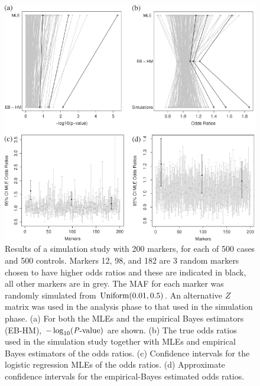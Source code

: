 \documentclass[oupdraft]{bio}
\begin{document}
\begin{figure}[!p]
\centering\includegraphics{fig2}
\caption{Results of a simulation study with 200 markers,
for each of 500 cases and 500 controls. Markers 12, 98,
and 182 are 3 random markers chosen to have higher odds
ratios and these are indicated in black, all other
markers are in grey. The MAF for each marker was randomly
simulated from $\hbox{Uniform} (0.01, 0.5)$. An
alternative $Z$ matrix was used in the analysis phase
to that used in the simulation phase. (a) For both the
MLEs and the empirical Bayes estimators (EB-HM),
$-\log_{10} (\hbox{\textit{P}-value})$
are shown. (b) The true odds ratios used in the
simulation study together with MLEs and empirical Bayes
estimators of the odds ratios. (c) Confidence intervals
for the logistic regression MLEs of the odds ratios.
(d) Approximate confidence intervals for the empirical-Bayes
estimated odds ratios.}
\label{Fig2}
\end{figure}
\end{document}

